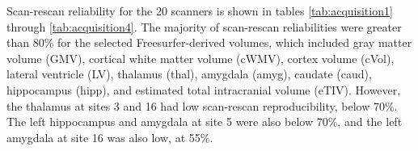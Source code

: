 Scan-rescan reliability for the 20 scanners is shown in tables \ref{tab:acquisition1} through \ref{tab:acquisition4}. The majority of scan-rescan reliabilities were greater than 80\% for the selected Freesurfer-derived volumes, which included gray matter volume (GMV), cortical white matter volume (cWMV), cortex volume (cVol), lateral ventricle (LV), thalamus (thal), amygdala (amyg), caudate (caud), hippocampus (hipp), and estimated total intracranial volume (eTIV). However, the thalamus at sites 3 and 16 had low scan-rescan reproducibility, below 70\%. The left hippocampus and amygdala at site 5 were also below 70\%, and the left amygdala at site 16 was also low, at 55\%. %